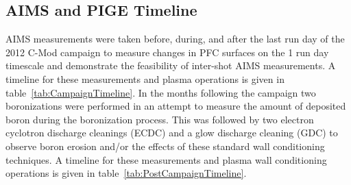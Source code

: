 \documentclass[final,3p,times,twocolumn]{elsarticle}
\begin{document}
\subsection{AIMS and PIGE Timeline}
\label{sec:AIMSPIGETimeline}
AIMS measurements were taken before, during, and after the last run day of the 2012 C-Mod campaign to measure changes in PFC surfaces on the 1 run day timescale and demonstrate the feasibility of inter-shot AIMS measurements.  A timeline for these measurements and plasma operations is given in table~\ref{tab:CampaignTimeline}.
%
In the months following the campaign two boronizations were performed in an attempt to measure the amount of deposited boron during the boronization process. This was followed by two electron cyclotron discharge cleanings (ECDC) and a glow discharge cleaning (GDC) to observe boron erosion and/or the effects of these standard wall conditioning techniques.   A timeline for these measurements and plasma wall conditioning operations is given in table~\ref{tab:PostCampaignTimeline}. 
\end{document}
